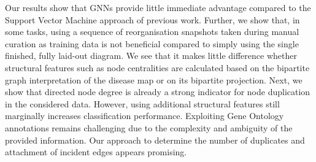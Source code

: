 \documentclass[
	fontsize=10pt, %
	twoside=true, %
	secnumdepth=1, %
  toc=indentunnumbered %
]{kaobook}
\begin{document}
Our results show that GNNs provide little immediate advantage compared to the
Support Vector Machine approach of previous work. 
%
Further, we show that, in some tasks, using a sequence of reorganisation
snapshots taken during manual curation as training data is not beneficial
compared to simply using the single finished, fully laid-out diagram.
%
We see that it makes little difference whether structural features such as node
centralities are calculated based on the bipartite graph interpretation of the
disease map or on its bipartite projection.
%
Next, we show that directed node degree is already a strong indicator for
node duplication in the considered data. However, using additional structural
features still marginally increases classification performance.
%
Exploiting Gene Ontology annotations remains challenging due to the complexity
and ambiguity of the provided information.
%
Our approach to determine the number of duplicates and attachment of incident
edges appears promising.





\end{document}
